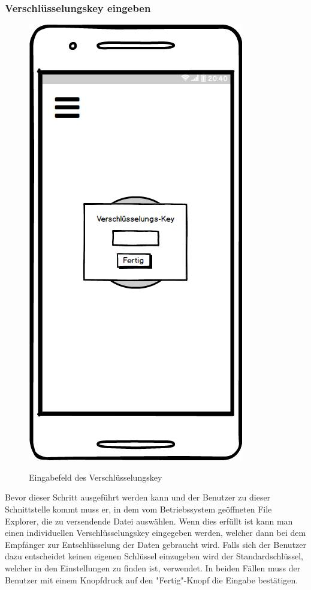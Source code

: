 \subsubsection{Verschlüsselungskey eingeben}
\begin{figure}[H]
	\centering
	\includegraphics[width=.5\linewidth]{pictures/Mobile/Verschluesselungskey.png}\
	\caption{Eingabefeld des Verschlüsselungskey}
\end{figure}
Bevor dieser Schritt ausgeführt werden kann und der Benutzer zu dieser Schnittstelle kommt muss er, in dem vom Betriebssystem geöffneten File Explorer, die zu versendende Datei auswählen. Wenn dies erfüllt ist kann man einen individuellen Verschlüsselungskey eingegeben werden, welcher dann bei dem Empfänger zur Entschlüsselung der Daten gebraucht wird. Falls sich der Benutzer dazu entscheidet keinen eigenen Schlüssel einzugeben wird der Standardschlüssel, welcher in den Einstellungen zu finden ist, verwendet. In beiden Fällen muss der Benutzer mit einem Knopfdruck auf den "Fertig"-Knopf die Eingabe bestätigen.
